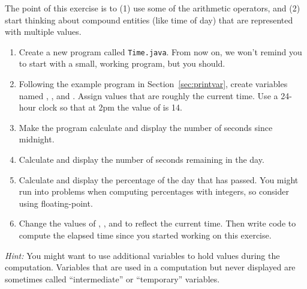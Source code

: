 \begin{exercise}

The point of this exercise is to (1) use some of the arithmetic operators, and (2) start thinking about compound entities (like time of day) that are represented with multiple values.

\begin{enumerate}

\item Create a new program called {\tt Time.java}.
From now on, we won't remind you to start with a small, working program, but you should.

\item Following the example program in Section~\ref{sec:printvar}, create variables named , , and .
Assign values that are roughly the current time.
Use a 24-hour clock so that at 2pm the value of  is 14.

\item Make the program calculate and display the number of seconds since midnight.

\item Calculate and display the number of seconds remaining in the day.

\item Calculate and display the percentage of the day that has passed.
You might run into problems when computing percentages with integers, so consider using floating-point.

\item Change the values of , , and  to reflect the current time.
Then write code to compute the elapsed time since you started working on this exercise.

\end{enumerate}

{\it Hint:} You might want to use additional variables to hold values during the computation.
Variables that are used in a computation but never displayed are sometimes called ``intermediate'' or ``temporary'' variables.

\end{exercise}
